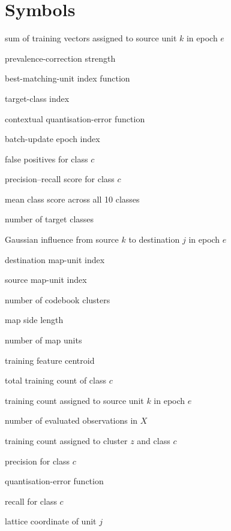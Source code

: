 \section{Symbols}
\begin{list}{}{\setlength{\labelwidth}{.2\columnwidth}\setlength{\leftmargin}{.24\columnwidth}\setlength{\itemsep}{0pt}\setlength{\parsep}{0pt}\renewcommand{\makelabel}[1]{#1\hfil}}
\item[$\mathbf{a}_k^{(e)}$] sum of training vectors assigned to source unit $k$ in epoch $e$
\item[$\alpha$] prevalence-correction strength
\item[$b$] best-matching-unit index function
\item[$c$] target-class index
\item[$d$] contextual quantisation-error function
\item[$e$] batch-update epoch index
\item[$f_c$] false positives for class $c$
\item[$F_{1,c}$] precision--recall score for class $c$
\item[$F_{1,\mathrm{macro}}$] mean class score across all 10 classes
\item[$g$] number of target classes
\item[$h_{jk}^{(e)}$] Gaussian influence from source $k$ to destination $j$ in epoch $e$
\item[$j$] destination map-unit index
\item[$k$] source map-unit index
\item[$K$] number of codebook clusters
\item[$\ell$] map side length
\item[$m$] number of map units
\item[$\boldsymbol{\mu}_T$] training feature centroid
\item[$n_c$] total training count of class $c$
\item[$n_k^{(e)}$] training count assigned to source unit $k$ in epoch $e$
\item[$n_X$] number of evaluated observations in $X$
\item[$n_{zc}$] training count assigned to cluster $z$ and class $c$
\item[$p_c$] precision for class $c$
\item[$q$] quantisation-error function
\item[$r_c$] recall for class $c$
\item[$\mathbf{r}_j$] lattice coordinate of unit $j$

\end{list}
